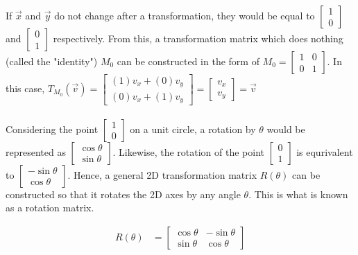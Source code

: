 \documentclass[12pt, a4paper]{article}
\begin{document}
If $\vec{x}$ and $\vec{y}$ do not change after a transformation, they would be
equal to $\begin{bmatrix} 1 \\ 0 \end{bmatrix}$ and $\begin{bmatrix} 0 \\ 1
    \end{bmatrix}$ respectively. From this, a transformation matrix which does nothing
(called the "identity") $M_0$ can be constructed in the form of
$
    M_0 = \begin{bmatrix}
        1 & 0 \\
        0 & 1
    \end{bmatrix}
$. In this case, $T_{M_0}(\vec{v}) = \begin{bmatrix}
        (1)v_x + (0)v_y \\
        (0)v_x + (1)v_y \end{bmatrix} = \begin{bmatrix} v_x \\
        v_y
    \end{bmatrix} = \vec{v}$ \\\\

Considering the point $\begin{bmatrix} 1 \\ 0 \end{bmatrix}$ on a unit circle,
a rotation by $\theta$ would be represented as $\begin{bmatrix} \cos\theta \\
\sin\theta \end{bmatrix}$. Likewise, the rotation of the point $\begin{bmatrix}
0 \\ 1 \end{bmatrix}$ is equrivalent to $\begin{bmatrix} -\sin\theta \\
\cos\theta \end{bmatrix}$. Hence, a general 2D transformation matrix $R(\theta)$
can be constructed so that it rotates the 2D axes by any angle $\theta$. This is
what is known as a rotation matrix.

\begin{align*}
    R(\theta) & = \begin{bmatrix}
                      \cos\theta & -\sin\theta \\
                      \sin\theta & \cos\theta
                  \end{bmatrix}
\end{align*}
\end{document}
